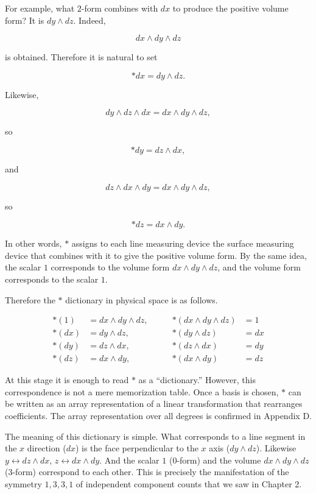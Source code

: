 \documentclass[a4paper,12pt,openany]{book}
\begin{document}
For example, what \(2\)-form combines with \(dx\) to produce the
positive volume form? It is \(dy \wedge dz\). Indeed,

\[
dx \wedge dy \wedge dz
\]

is obtained. Therefore it is natural to set

\[
\ast dx = dy \wedge dz.
\]

Likewise,

\[
dy \wedge dz \wedge dx = dx \wedge dy \wedge dz,
\]

so

\[
\ast dy = dz \wedge dx,
\]

and

\[
dz \wedge dx \wedge dy = dx \wedge dy \wedge dz,
\]

so

\[
\ast dz = dx \wedge dy.
\]

In other words, \(\ast\) assigns to each line measuring device the
surface measuring device that combines with it to give the positive
volume form. By the same idea, the scalar \(1\) corresponds to the
volume form \(dx \wedge dy \wedge dz\), and the volume form corresponds
to the scalar \(1\).

Therefore the \(\ast\) dictionary in physical space is as follows.

\[\begin{aligned}
\ast(1) &= dx \wedge dy \wedge dz, \qquad &\ast(dx \wedge dy \wedge dz) &= 1 \\
\ast(dx) &= dy \wedge dz, \qquad &\ast(dy \wedge dz) &= dx \\
\ast(dy) &= dz \wedge dx, \qquad &\ast(dz \wedge dx) &= dy \\
\ast(dz) &= dx \wedge dy, \qquad &\ast(dx \wedge dy) &= dz
\end{aligned}\]

At this stage it is enough to read \(\ast\) as a ``dictionary.''
However, this correspondence is not a mere memorization table. Once a
basis is chosen, \(\ast\) can be written as an array representation of a
linear transformation that rearranges coefficients. The array
representation over all degrees is confirmed in Appendix D.

The meaning of this dictionary is simple. What corresponds to a line
segment in the \(x\) direction (\(dx\)) is the face perpendicular to the
\(x\) axis (\(dy \wedge dz\)). Likewise
\(y \leftrightarrow dz \wedge dx\), \(z \leftrightarrow dx \wedge dy\).
And the scalar \(1\) (\(0\)-form) and the volume
\(dx \wedge dy \wedge dz\) (\(3\)-form) correspond to each other. This
is precisely the manifestation of the symmetry \(1, 3, 3, 1\) of
independent component counts that we saw in Chapter 2.
\end{document}
